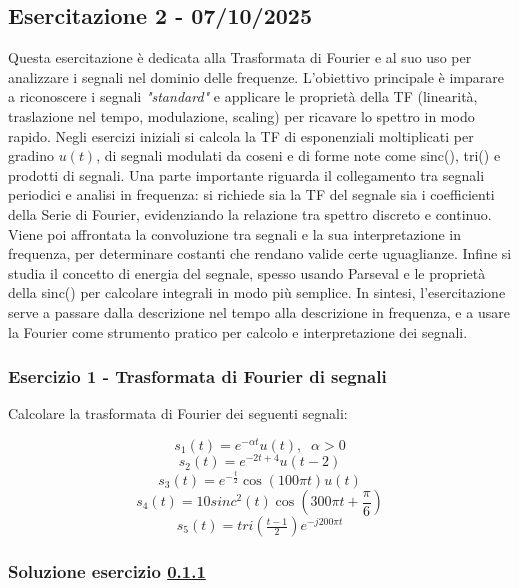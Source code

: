 \documentclass[../main.tex]{subfiles}
\begin{document}
\clearpage
\thispagestyle{empty}
\vspace*{7cm}
\subsection{Esercitazione 2 - 07/10/2025}
\vspace*{1.5cm}


Questa esercitazione è dedicata alla Trasformata di Fourier e al suo uso per analizzare i segnali nel dominio delle frequenze.  
L’obiettivo principale è imparare a riconoscere i segnali \textit{"standard"} e applicare le proprietà della TF (linearità, traslazione nel tempo, modulazione, scaling) per ricavare lo spettro in modo rapido. 
Negli esercizi iniziali si calcola la TF di esponenziali moltiplicati per gradino $u(t)$, di segnali modulati da coseni e di forme note come sinc(), tri() e prodotti di segnali.  
Una parte importante riguarda il collegamento tra segnali periodici e analisi in frequenza: si richiede sia la TF del segnale sia i coefficienti della Serie di Fourier, evidenziando la relazione tra spettro discreto e continuo. 
 Viene poi affrontata la convoluzione tra segnali e la sua interpretazione in frequenza, per determinare costanti che rendano valide certe uguaglianze. 
 Infine si studia il concetto di energia del segnale, spesso usando Parseval e le proprietà della sinc() per calcolare integrali in modo più semplice.  
In sintesi, l’esercitazione serve a passare dalla descrizione nel tempo alla descrizione in frequenza, e a usare la Fourier come strumento pratico per calcolo e interpretazione dei segnali.

\vspace*{1.5cm}
\subsubsection{Esercizio 1 - Trasformata di Fourier di segnali}
\label{ss21}

Calcolare la trasformata di Fourier dei seguenti segnali:


\[ s_1(t) = e^{-\alpha t} u(t),\;\; \alpha > 0 \] 
\[ s_2(t) = e^{-2t +4}u(t-2) \]
\[ s_3(t) = e^{-\frac{t}{2}}\cos(100\pi t)u(t) \]
\[ s_4(t) = 10\unit{sinc}^2(t) \cos(300\pi t + \frac{\pi}{6})\]
\[ s_5(t) = \unit{tri}(\tfrac{t-1}{2}) e^{-j200\pi t}  \]


\subsubsection*{Soluzione esercizio \ref{ss21}}
\end{document}
